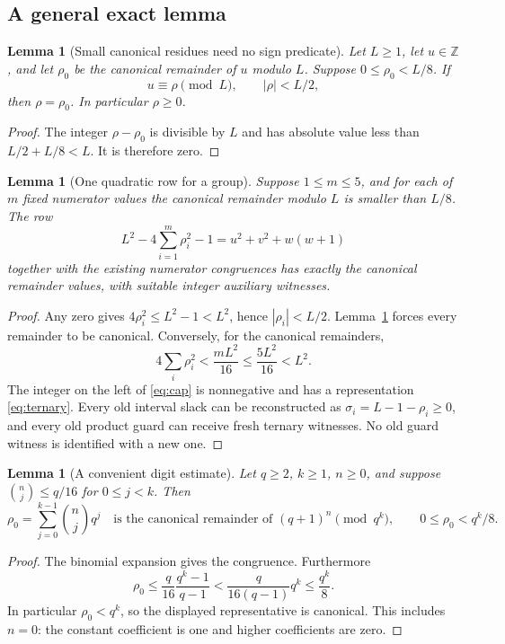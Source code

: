 \documentclass[11pt,letterpaper]{article}
\newtheorem{lemma}[theorem]{Lemma}
\theoremstyle{definition}\newtheorem{definition}[theorem]{Definition}
\theoremstyle{remark}\newtheorem{remark}[theorem]{Remark}
\newcommand{\Z}{\ensuremath{\mathbb Z}}
\begin{document}
\subsection{A general exact lemma}
\begin{lemma}[Small canonical residues need no sign predicate]\label{lem:residue}
Let \(L\ge1\), let \(u\in\Z\), and let \(\rho_0\) be the canonical remainder of \(u\) modulo \(L\). Suppose \(0\le\rho_0<L/8\). If
\[
 u\equiv\rho\pmod L,\qquad |\rho|<L/2,
\]
then \(\rho=\rho_0\). In particular \(\rho\ge0\).
\end{lemma}
\begin{proof}
The integer \(\rho-\rho_0\) is divisible by \(L\) and has absolute value less than \(L/2+L/8<L\). It is therefore zero.
\end{proof}

\begin{lemma}[One quadratic row for a group]\label{lem:group}
Suppose \(1\le m\le5\), and for each of \(m\) fixed numerator values the canonical remainder modulo \(L\) is smaller than \(L/8\). The row
\begin{equation}\label{eq:cap}
 \boxed{L^2-4\sum_{i=1}^{m}\rho_i^2-1
       =u^2+v^2+w(w+1)}
\end{equation}
together with the existing numerator congruences has exactly the canonical remainder values, with suitable integer auxiliary witnesses.
\end{lemma}
\begin{proof}
Any zero gives \(4\rho_i^2\le L^2-1<L^2\), hence \(|\rho_i|<L/2\). Lemma~\ref{lem:residue} forces every remainder to be canonical. Conversely, for the canonical remainders,
\[
 4\sum_i\rho_i^2 < \frac{mL^2}{16}\le\frac{5L^2}{16}<L^2.
\]
The integer on the left of \eqref{eq:cap} is nonnegative and has a representation \eqref{eq:ternary}. Every old interval slack can be reconstructed as \(\sigma_i=L-1-\rho_i\ge0\), and every old product guard can receive fresh ternary witnesses. No old guard witness is identified with a new one.
\end{proof}

\begin{lemma}[A convenient digit estimate]\label{lem:digits}
Let \(q\ge2\), \(k\ge1\), \(n\ge0\), and suppose
\(\binom nj\le q/16\) for \(0\le j<k\). Then
\[
 \rho_0=\sum_{j=0}^{k-1}\binom njq^j
 \quad\text{is the canonical remainder of }(q+1)^n\pmod{q^k},
 \qquad 0\le\rho_0<q^k/8.
\]
\end{lemma}
\begin{proof}
The binomial expansion gives the congruence. Furthermore
\[
 \rho_0\le\frac q{16}\frac{q^k-1}{q-1}
 <\frac{q}{16(q-1)}q^k\le\frac{q^k}{8}.
\]
In particular \(\rho_0<q^k\), so the displayed representative is canonical. This includes \(n=0\): the constant coefficient is one and higher coefficients are zero.
\end{proof}
\end{document}
